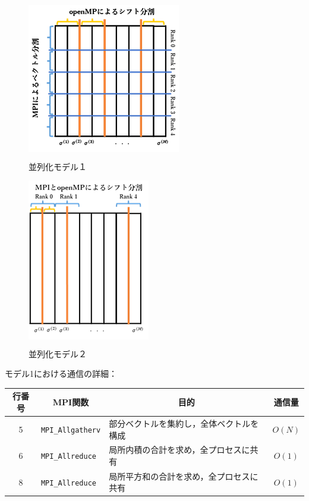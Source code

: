\begin{figure}[H]
	\begin{center}
		\begin{minipage}[t]{0.49\columnwidth}
			\centering
			\colorbox{white}{ \includegraphics[scale=1.8]{./fig/parallel-model1.png} }
			\caption{並列化モデル１}
			\label{fig-parallel-model1}
		\end{minipage}
		\begin{minipage}[t]{0.49\columnwidth}
			\centering
			\colorbox{white}{ \includegraphics[scale=1.8]{./fig/parallel-model2.png} }
			\caption{並列化モデル２}
			\label{fig-parallel-model2}
		\end{minipage}
	\end{center}
\end{figure}

モデル1における通信の詳細：
\begin{table}[H]
	\centering
	\small
	\begin{tabular}{|c|l|l|c|}
	\hline
	行番号	& \multicolumn{1}{c|}{MPI関数}	& \multicolumn{1}{c|}{目的}				& 通信量	\\ \hline
	5		& \texttt{MPI\_Allgatherv}	& 部分ベクトルを集約し，全体ベクトルを構成		& $O(N)$	\\ \hline
	6		& \texttt{MPI\_Allreduce}	& 局所内積の合計を求め，全プロセスに共有		& $O(1)$	\\ \hline
	8		& \texttt{MPI\_Allreduce}	& 局所平方和の合計を求め，全プロセスに共有	& $O(1)$	\\ \hline
	\end{tabular}
\end{table}



